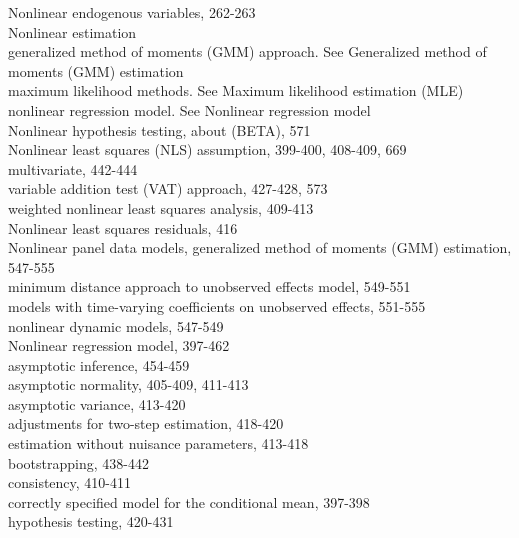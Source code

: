 \documentclass[10pt]{article}
\begin{document}
Nonlinear endogenous variables, 262-263\\
Nonlinear estimation\\
generalized method of moments (GMM) approach. See Generalized method of moments (GMM) estimation\\
maximum likelihood methods. See Maximum likelihood estimation (MLE)\\
nonlinear regression model. See Nonlinear regression model\\
Nonlinear hypothesis testing, about (BETA), 571\\
Nonlinear least squares (NLS) assumption, 399-400, 408-409, 669\\
multivariate, 442-444\\
variable addition test (VAT) approach, 427-428, 573\\
weighted nonlinear least squares analysis, 409-413\\
Nonlinear least squares residuals, 416\\
Nonlinear panel data models, generalized method of moments (GMM) estimation, 547-555\\
minimum distance approach to unobserved effects model, 549-551\\
models with time-varying coefficients on unobserved effects, 551-555\\
nonlinear dynamic models, 547-549\\
Nonlinear regression model, 397-462\\
asymptotic inference, 454-459\\
asymptotic normality, 405-409, 411-413\\
asymptotic variance, 413-420\\
adjustments for two-step estimation, 418-420\\
estimation without nuisance parameters, 413-418\\
bootstrapping, 438-442\\
consistency, 410-411\\
correctly specified model for the conditional mean, 397-398\\
hypothesis testing, 420-431
\end{document}
